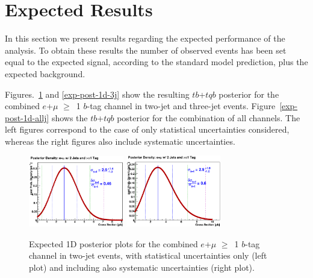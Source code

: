 \section{Expected Results}
\label{exp-performance}

In this section we present results regarding the expected performance
of the analysis. To obtain these results the number of observed events
has been set equal to the expected signal, according to the standard
model prediction, plus the expected background.

Figures.~\ref{exp-post-1d-2j} and \ref{exp-post-1d-3j} show the
resulting $tb$+$tqb$ posterior for the combined $e$+$\mu$ $\geq$~1
$b$-tag channel in two-jet and three-jet events.
Figure~\ref{exp-post-1d-allj} shows the $tb$+$tqb$ posterior for the
combination of all channels. The left figures correspond to the case
of only statistical uncertainties considered, whereas the right
figures also include systematic uncertainties.

\vspace{0.1in}
\begin{figure}[!h!tbp]
\includegraphics[width=0.37\textwidth]
{figures/posterior/nosys/expected_limit_TBTQ_LeptonsCombined_2Jet_TagsCombined}
\includegraphics[width=0.37\textwidth]
{figures/posterior/sys/expected_limit_TBTQ_LeptonsCombined_2Jet_TagsCombined}
\vspace{-0.1in}
\caption[exppost1d2j]{Expected 1D posterior plots for the combined
$e$+$\mu$ $\geq$~1 $b$-tag channel in two-jet events, with statistical
uncertainties only (left plot) and including also systematic
uncertainties (right plot).}
\label{exp-post-1d-2j}
\end{figure}

